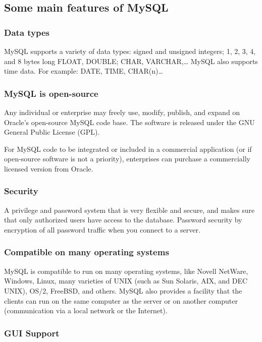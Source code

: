 \documentclass[a4paper]{article}
\numberwithin{equation}{section}
\begin{document}
\subsection{Some main features of MySQL}
\subsubsection{Data types}
        MySQL supports a variety of data types: signed and unsigned integers; 1, 2, 3, 4, and 8 bytes long FLOAT, DOUBLE; CHAR, VARCHAR,\dots
        MySQL also supports time data.
        For example: DATE, TIME, CHAR(n)\dots

\subsubsection{MySQL is open-source}
        Any individual or enterprise may freely use, modify, publish, and expand on Oracle’s open-source MySQL code base.
        The software is released under the GNU General Public License (GPL).

        For MySQL code to be integrated or included in a commercial application (or if open-source software is not a priority), enterprises can purchase a commercially licensed version from Oracle.

\subsubsection{Security}
        A privilege and password system that is very flexible and secure, and makes sure that only authorized users have access to the database.
        Password security by encryption of all password traffic when you connect to a server.

\subsubsection{Compatible on many operating systems}

MySQL is compatible to run on many operating systems, like Novell NetWare, Windows, Linux, many varieties of UNIX (such as Sun Solaris, AIX, and DEC UNIX), OS/2, FreeBSD, and others. MySQL also provides a facility that the clients can run on the same computer as the server or on another computer (communication via a local network or the Internet).

\subsubsection{GUI Support}
\end{document}
